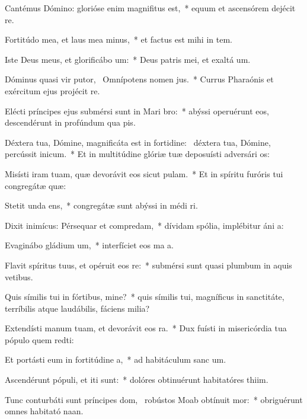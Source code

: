 \item Cantémus Dómino: glorióse enim magnifitus est,~* equum et ascensórem dejécit  re.
\item Fortitúdo mea, et laus mea minus,~* et factus est mihi in tem.
\item Iste Deus meus, et glorificábo um:~* Deus patris mei, et exaltá um.
\item Dóminus quasi vir putor,~\pscross{} Omnípotens nomen jus.~* Currus Pharaónis et exércitum ejus projécit  re.
\item Elécti príncipes ejus submérsi sunt in Mari bro:~* abýssi operuérunt eos, descendérunt in profúndum qua pis.
\item Déxtera tua, Dómine, magnificáta est in fortidine:~\pscross{} déxtera tua, Dómine, percússit inicum.~* Et in multitúdine glóriæ tuæ deposuísti adversári os:
\item Misísti iram tuam, quæ devorávit eos sicut pulam.~* Et in spíritu furóris tui congregátæ  quæ:
\item Stetit unda ens,~* congregátæ sunt abýssi in médi ri.
\item Dixit inimícus: Pérsequar et compredam,~* dívidam spólia, implébitur áni a:
\item Evaginábo gládium um,~* interfíciet eos ma a.
\item Flavit spíritus tuus, et opéruit eos re:~* submérsi sunt quasi plumbum in aquis vetibus.
\item Quis símilis tui in fórtibus, mine?~* quis símilis tui, magníficus in sanctitáte, terríbilis atque laudábilis, fáciens milia?
\item Extendísti manum tuam, et devorávit eos ra.~* Dux fuísti in misericórdia tua pópulo quem redti:
\item Et portásti eum in fortitúdine a,~* ad habitáculum sanc um.
\item Ascendérunt pópuli, et iti sunt:~* dolóres obtinuérunt habitatóres thiim.
\item Tunc conturbáti sunt príncipes dom,~\pscross{} robústos Moab obtínuit mor:~* obriguérunt omnes habitató naan.
